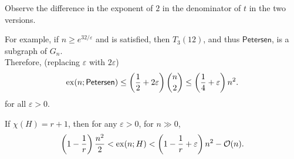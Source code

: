 \documentclass{article}
\begin{document}
			Observe the difference in the exponent of $2$ in the denominator of $t$ in the two versions.

			For example, if $n \ge e^{32/\varepsilon}$ and  is satisfied, then $T_{3}(12)$, and thus $\mathsf{Petersen}$, is a subgraph of $G_n$.\\
			Therefore, (replacing $\varepsilon$ with $2\varepsilon$)
			\[ \operatorname{ex}(n;\mathsf{Petersen}) \le \left(\frac{1}{2} + 2\varepsilon\right)\binom{n}{2} \le \left(\frac{1}{4} + \varepsilon\right)n^2. \]
			for all $\varepsilon > 0$.

			\begin{fcor}
				\label{theo: ESS exx square tight coloring}
				If $\chi(H) = r+1$, then for any $\varepsilon > 0$, for $n\gg 0$,
				\[ \left(1 - \frac{1}{r}\right)\frac{n^2}{2} < \operatorname{ex}(n;H) < \left(1 - \frac{1}{r} + \varepsilon\right)n^2 - \mathcal{O}(n). \]
			\end{fcor}

\end{document}
